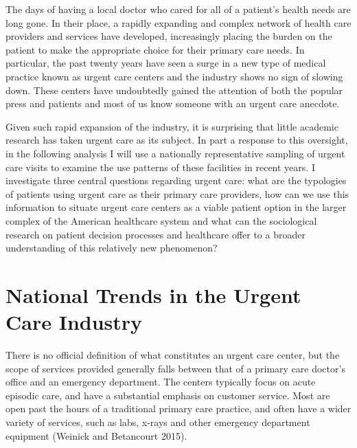 \documentclass[12pt,twoside]{reedthesis}
\begin{document}
  \setcounter{chapter}{1} \setcounter{section}{0}
  \fancyhead[LE,RO]{\thepage} \fancyhead[RE]{\slshape  }
  \fancyhead[LO]{\slshape  } \doublespacing
  
  The days of having a local doctor who cared for all of a patient's
  health needs are long gone. In their place, a rapidly expanding and
  complex network of health care providers and services have developed,
  increasingly placing the burden on the patient to make the appropriate
  choice for their primary care needs. In particular, the past twenty
  years have seen a surge in a new type of medical practice known as
  urgent care centers and the industry shows no sign of slowing down.
  These centers have undoubtedly gained the attention of both the popular
  press and patients and most of us know someone with an urgent care
  anecdote.
  
  Given such rapid expansion of the industry, it is surprising that little
  academic research has taken urgent care as its subject. In part a
  response to this oversight, in the following analysis I will use a
  nationally representative sampling of urgent care visits to examine the
  use patterns of these facilities in recent years. I investigate three
  central questions regarding urgent care: what are the typologies of
  patients using urgent care as their primary care providers, how can we
  use this information to situate urgent care centers as a viable patient
  option in the larger complex of the American healthcare system and what
  can the sociological research on patient decision processes and
  healthcare offer to a broader understanding of this relatively new
  phenomenon?
  
  \section*{National Trends in the Urgent Care
  Industry}\label{national-trends-in-the-urgent-care-industry}
  
  There is no official definition of what constitutes an urgent care
  center, but the scope of services provided generally falls between that
  of a primary care doctor's office and an emergency department. The
  centers typically focus on acute episodic care, and have a substantial
  emphasis on customer service. Most are open past the hours of a
  traditional primary care practice, and often have a wider variety of
  services, such as labs, x-rays and other emergency department equipment
  (Weinick and Betancourt 2015).
  
\end{document}

